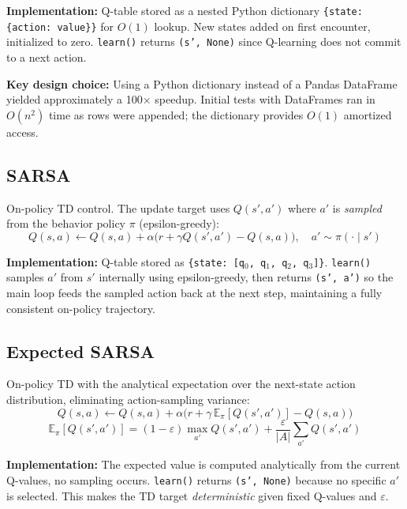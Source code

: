 \documentclass[11pt,letterpaper]{article}
\begin{document}
\textbf{Implementation:} Q-table stored as a nested Python dictionary
\texttt{\{state: \{action: value\}\}} for $O(1)$ lookup. New states added on first
encounter, initialized to zero. \texttt{learn()} returns \texttt{(s', None)} since
Q-learning does not commit to a next action.

\textbf{Key design choice:} Using a Python dictionary instead of a Pandas DataFrame
yielded approximately a 100$\times$ speedup. Initial tests with DataFrames ran in
$O(n^2)$ time as rows were appended; the dictionary provides $O(1)$ amortized access.

\subsection{SARSA}

On-policy TD control. The update target uses $Q(s', a')$ where $a'$ is \emph{sampled}
from the behavior policy $\pi$ (epsilon-greedy):
\begin{equation}
  Q(s,a) \leftarrow Q(s,a) + \alpha\bigl(r + \gamma Q(s',a') - Q(s,a)\bigr),\quad
  a' \sim \pi(\cdot\mid s')
\end{equation}

\textbf{Implementation:} Q-table stored as \texttt{\{state: [q$_0$, q$_1$, q$_2$, q$_3$]\}}.
\texttt{learn()} samples $a'$ from $s'$ internally using epsilon-greedy, then returns
\texttt{(s', a')} so the main loop feeds the sampled action back at the next step,
maintaining a fully consistent on-policy trajectory.

\subsection{Expected SARSA}

On-policy TD with the analytical expectation over the next-state action distribution,
eliminating action-sampling variance:
\begin{equation}
  Q(s,a) \leftarrow Q(s,a) + \alpha\bigl(r + \gamma\,\mathbb{E}_{\pi}[Q(s',a')] - Q(s,a)\bigr)
\end{equation}
\begin{equation}
  \mathbb{E}_{\pi}[Q(s',a')] = (1-\varepsilon)\max_{a'}Q(s',a')
    + \frac{\varepsilon}{|A|}\sum_{a'}Q(s',a')
\end{equation}

\textbf{Implementation:} The expected value is computed analytically from the current
Q-values, no sampling occurs. \texttt{learn()} returns \texttt{(s', None)} because
no specific $a'$ is selected. This makes the TD target \emph{deterministic} given
fixed Q-values and $\varepsilon$.
\end{document}
